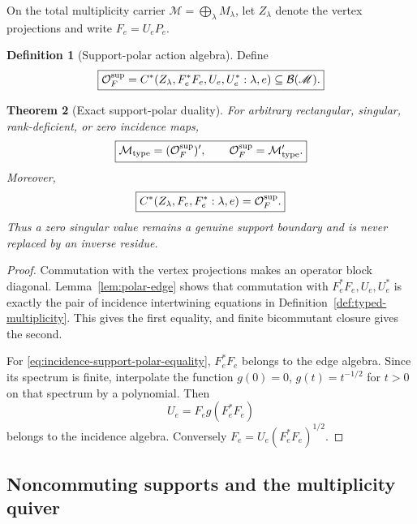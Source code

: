 \documentclass[11pt]{article}
\newtheorem{theorem}{Theorem}[section]
\theoremstyle{definition}
\newtheorem{definition}[theorem]{Definition}
\theoremstyle{remark}
\newcommand{\M}{\mathcal M}
\newcommand{\Oalg}{\mathcal O}
\begin{document}
On the total multiplicity carrier
$\mathscr M=\bigoplus_\lambda M_\lambda$, let $Z_\lambda$ denote the vertex
projections and write $F_e=U_eP_e$.

\begin{definition}[Support-polar action algebra]
\label{def:support-polar}
Define
\begin{equation}
\boxed{
\Oalg_F^{\rm sup}
=
C^*(Z_\lambda,F_e^*F_e,U_e,U_e^*:\lambda,e)
\subseteq\mathcal B(\mathscr M).}
\label{eq:support-polar}
\end{equation}
\end{definition}

\begin{theorem}[Exact support-polar duality]
\label{thm:support-polar}
For arbitrary rectangular, singular, rank-deficient, or zero incidence maps,
\begin{equation}
\boxed{
\M_{\rm type}
=
(\Oalg_F^{\rm sup})',
\qquad
\Oalg_F^{\rm sup}
=
\M_{\rm type}'.}
\label{eq:support-polar-duality}
\end{equation}
Moreover,
\begin{equation}
\boxed{
C^*(Z_\lambda,F_e,F_e^*:\lambda,e)
=
\Oalg_F^{\rm sup}.}
\label{eq:incidence-support-polar-equality}
\end{equation}
Thus a zero singular value remains a genuine support boundary and is never
replaced by an inverse residue.
\end{theorem}

\begin{proof}
Commutation with the vertex projections makes an operator block diagonal.
Lemma~\ref{lem:polar-edge} shows that commutation with
$F_e^*F_e,U_e,U_e^*$ is exactly the pair of incidence intertwining equations
in Definition~\ref{def:typed-multiplicity}.  This gives the first equality,
and finite bicommutant closure gives the second.

For \eqref{eq:incidence-support-polar-equality}, $F_e^*F_e$ belongs to the edge
algebra.  Since its spectrum is finite, interpolate the function
$g(0)=0$, $g(t)=t^{-1/2}$ for $t>0$ on that spectrum by a polynomial.
Then
\[
U_e=F_eg(F_e^*F_e)
\]
belongs to the incidence algebra.  Conversely
$F_e=U_e(F_e^*F_e)^{1/2}$.
\end{proof}

\subsection{Noncommuting supports and the multiplicity quiver}
\end{document}
